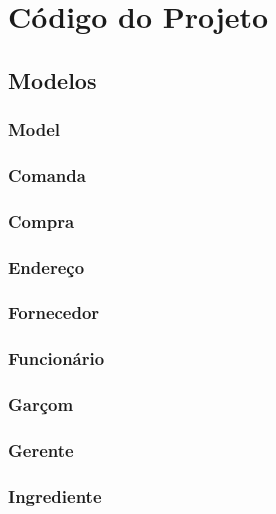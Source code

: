 \section{Código do Projeto}

\subsection{Modelos}

\subsubsection{Model}
%
\subsubsection{Comanda}

\subsubsection{Compra}

\subsubsection{Endereço}

\subsubsection{Fornecedor}

\subsubsection{Funcionário}

\subsubsection{Garçom}

\subsubsection{Gerente}

\subsubsection{Ingrediente}

